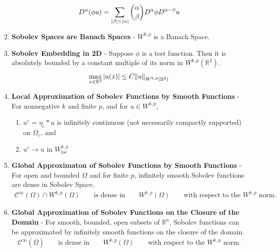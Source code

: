 \documentclass{article}
\newcommand{\E}{\varepsilon}
\newcommand{\Rl}{\mathbb{R}}
\begin{document}
\begin{enumerate}
            \begin{align*}
                D^\alpha(\phi u) = \sum_{\abs{\beta} \leq \abs{\alpha}} \binom{\alpha}{\beta}D^\alpha \phi D^{\alpha - \beta} u
            \end{align*}
        \item
            \textbf{Sobolev Spaces are Banach Spaces} - $W^{k,p}$ is a Banach Space.
        \item
            \textbf{Sobolev Embedding in 2D} - Suppose $\phi$ is a test function.  Then it is absolutely bounded by a constant multiple of its norm in $W^{k,p}(\Rl^2)$.
            \begin{align*}
                \max_{x\in\Rl^2}\abs{u(x)} \leq C \norm{u}_{W^{k,p}(\Rl^2)}
            \end{align*}
        \item
            \textbf{Local Approximation of Sobolev Functions by Smooth Functions} - For nonnegative $k$ and finite $p$, and for $u \in W^{k,p}$,
            \begin{enumerate}
                \item
                    $u^\E = \eta_\E * u$ is infinitely continuous (not necessarily compactly supported) on $\Omega_\E$, and
                \item
                    $u^\E \rightarrow u$ in $W_\text{loc}^{k,p}$
            \end{enumerate}
        \item
            \textbf{Global Approximaton of Sobolev Functions by Smooth Functions} - For open and bounded $\Omega$ and for finite $p$, infinitely smooth Sobolev functions are dense in Sobolev Space.
            \begin{align*}
                \mathcal{C}^\infty(\Omega) \cap W^{k,p}(\Omega) \qquad \text{is dense in} \qquad W^{k,p}(\Omega) \qquad \text{with respect to the $W^{k,p}$ norm.}
            \end{align*}
        \item
            \textbf{Global Approximation of Sobolev Functions on the Closure of the Domain} - For smooth, bounded, open subsets of $\Rl^n$, Sobolev functions can be approximated by infinitely smooth functions on the closure of the domain.
            \begin{align*}
                \mathcal{C}^\infty(\overline{\Omega}) \qquad \text{is dense in} \qquad W^{k,p}(\Omega) \qquad \text{with respect to the $W^{k,p}$ norm.}
            \end{align*}

\end{enumerate}
\end{document}
